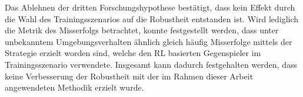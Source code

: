 Das Ablehnen der dritten Forschungshypothese bestätigt, dass kein Effekt durch die Wahl des Trainingsszenarios auf die Robustheit entstanden ist.
Wird lediglich die Metrik des Misserfolgs betrachtet, konnte festgestellt werden, dass unter unbekanntem Umgebungsverhalten ähnlich gleich häufig Misserfolge mittels der Strategie erzielt worden sind, welche den RL basierten Gegenspieler im Trainingsszenario verwendete.
Insgesamt kann dadurch festgehalten werden, dass keine Verbesserung der Robustheit mit der im Rahmen dieser Arbeit angewendeten Methodik erzielt wurde.
